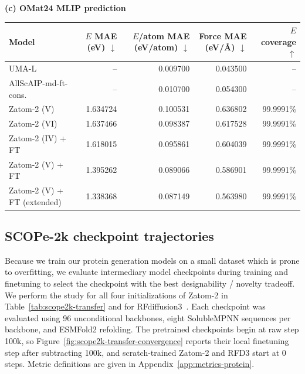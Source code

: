\documentclass{article} %
\begin{document}
\begin{table}[!t]
  \vspace{0.4em}
  {\textbf{(c) OMat24 MLIP prediction}\par}
  \vspace{0.25em}
  \begin{tabular*}{\linewidth}{@{\extracolsep{\fill}}lrrrr@{}}
    \toprule
    Model & $E$ MAE (eV) $\downarrow$ &
    $E$/atom MAE (eV/atom) $\downarrow$ &
    Force MAE (eV/\AA) $\downarrow$ & $E$ coverage $\uparrow$ \\
    \midrule
    UMA-L & -- & 0.009700 & 0.043500 & -- \\
    AllScAIP-md-ft-cons. & -- & 0.010700 & 0.054300 & -- \\
    \midrule
    Zatom-2 (V) & 1.634724 & 0.100531 & 0.636802 & 99.9991\% \\
    Zatom-2 (VI) & 1.637466 & 0.098387 & 0.617528 & 99.9991\% \\
    \midrule
    Zatom-2 (IV) + FT & 1.618015 & 0.095861 & 0.604039 & 99.9991\% \\
    Zatom-2 (V) + FT & 1.395262 & 0.089066 & 0.586901 & 99.9991\% \\
    \midrule
    Zatom-2 (V) + FT (extended) & 1.338368 & 0.087149 & 0.563980 & 99.9991\% \\
    \bottomrule
  \end{tabular*}
\end{table}
\FloatBarrier

\subsection{SCOPe-2k checkpoint trajectories}
\label{app:scope2k-transfer-convergence}

Because we train our protein generation models on a small dataset which is prone to overfitting, we evaluate intermediary model checkpoints during training and finetuning to select the checkpoint with the best designability / novelty tradeoff. We perform the study for all four initializations of Zatom-2 in Table~\ref{tab:scope2k-transfer} and for RFdiffusion3~\citep{butcher2025rfdiffusion3}. Each checkpoint
was evaluated using 96 unconditional backbones, eight SolubleMPNN sequences per
backbone, and ESMFold2 refolding. The pretrained checkpoints begin at raw step
100k, so Figure~\ref{fig:scope2k-transfer-convergence} reports their local
finetuning step after subtracting 100k, and scratch-trained Zatom-2 and RFD3 start at 0 steps. Metric definitions are given in
Appendix~\ref{app:metrics-protein}.
\end{document}
